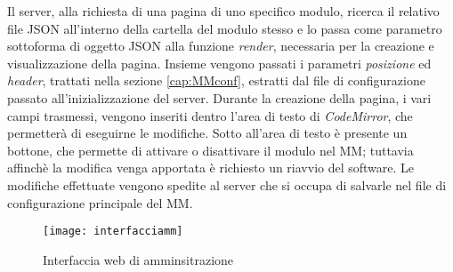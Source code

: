 Il server, alla richiesta di una pagina di uno specifico modulo, ricerca il relativo file JSON all'interno della cartella del modulo stesso e lo
passa come parametro sottoforma di oggetto JSON alla funzione \textit{render}, necessaria per la creazione e visualizzazione della pagina.
Insieme vengono passati i parametri \textit{posizione} ed \textit{header}, trattati nella sezione \ref{cap:MMconf}, estratti dal file
di configurazione passato all'inizializzazione del server.
Durante la creazione della pagina, i vari campi trasmessi, vengono inseriti dentro l'area di testo di \textit{CodeMirror}, che permetter\`a di eseguirne
le modifiche. Sotto all'area di testo \`e presente un bottone, che permette di attivare o disattivare il modulo nel MM; tuttavia affinch\`e la modifica
venga apportata \`e richiesto un riavvio del software. Le modifiche effettuate vengono spedite al server che si occupa di salvarle nel file di configurazione
principale del MM.


\begin{figure}[H]
    \texttt{[image: interfacciamm]}
    \caption{Interfaccia web di amminsitrazione}
    \label{fig:interfaccia}
\end{figure}
